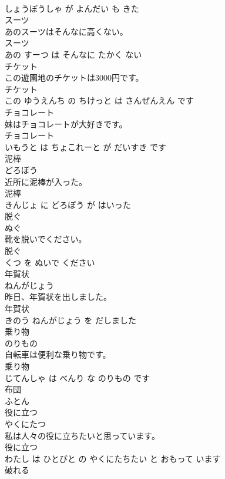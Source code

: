 \documentclass[8pt]{extreport}
\begin{document}
\begin{CJK}{UTF8}{min}
\\	しょうぼうしゃ が よんだい も きた			
\\	スーツ	
\\	あのスーツはそんなに高くない。	
\\	スーツ 
\\	あの すーつ は そんなに たかく ない			
\\	チケット	
\\	この遊園地のチケットは3000円です。	
\\	チケット 
\\	この ゆうえんち の ちけっと は さんぜんえん です			
\\	チョコレート	
\\	妹はチョコレートが大好きです。	
\\	チョコレート 
\\	いもうと は ちょこれーと が だいすき です			
\\	泥棒	
\\	どろぼう			
\\	近所に泥棒が入った。	
\\	泥棒 
\\	きんじょ に どろぼう が はいった			
\\	脱ぐ	
\\	ぬぐ			
\\	靴を脱いでください。	
\\	脱ぐ 
\\	くつ を ぬいで ください			
\\	年賀状	
\\	ねんがじょう			
\\	昨日、年賀状を出しました。	
\\	年賀状 
\\	きのう ねんがじょう を だしました			
\\	乗り物	
\\	のりもの			
\\	自転車は便利な乗り物です。	
\\	乗り物 
\\	じてんしゃ は べんり な のりもの です			
\\	布団	
\\	ふとん			
\\	役に立つ	
\\	やくにたつ			
\\	私は人々の役に立ちたいと思っています。	
\\	役に立つ 
\\	わたし は ひとびと の やくにたちたい と おもって います			
\\	破れる	

\end{CJK}
\end{document}
